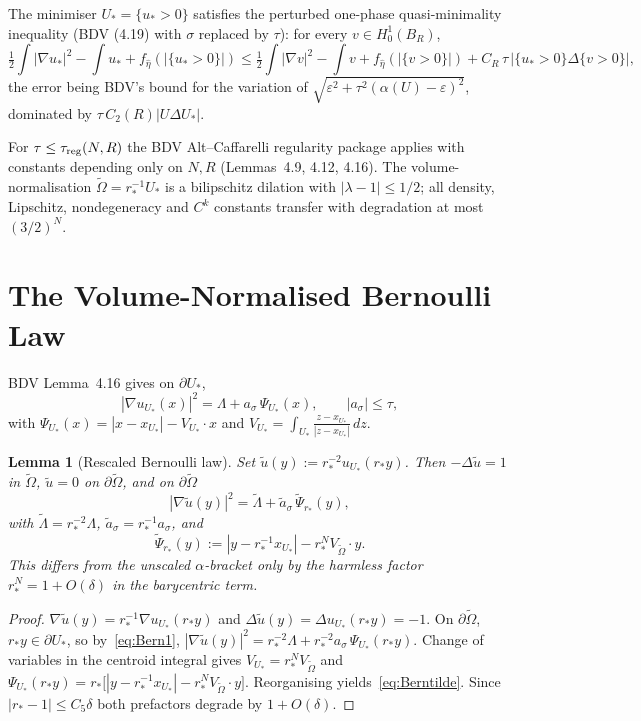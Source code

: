 \documentclass[11pt]{article}
\newtheorem{lemma}[theorem]{Lemma}
\theoremstyle{definition}
\newcommand{\eps}{\varepsilon}
\newcommand{\wt}{\widetilde}
\newcommand{\Om}{\Omega}
\begin{document}
The minimiser $U_*=\{u_*>0\}$ satisfies the perturbed one-phase
quasi-minimality inequality (BDV (4.19) with $\sigma$ replaced by $\tau$):
for every $v\in H^1_0(B_R)$,
\begin{equation}\label{eq:qmin}
\tfrac12\!\int|\nabla u_*|^2-\!\int u_*+f_{\hat\eta}(|\{u_*>0\}|)
\le\tfrac12\!\int|\nabla v|^2-\!\int v+f_{\hat\eta}(|\{v>0\}|)
+C_R\,\tau\,\bigl|\{u_*>0\}\Delta\{v>0\}\bigr|,
\end{equation}
the error being BDV's bound for the variation of
$\sqrt{\eps^2+\tau^2(\alpha(U)-\eps)^2}$, dominated by
$\tau\,C_2(R)|U\Delta U_*|$.

For $\tau\le\tau_{\rm reg}(N,R)$ the BDV Alt--Caffarelli regularity package
applies with constants depending only on $N,R$ (Lemmas~4.9, 4.12, 4.16).
The volume-normalisation $\wt\Om=r_*^{-1}U_*$ is a bilipschitz dilation with
$|\lambda-1|\le1/2$; all density, Lipschitz, nondegeneracy and $C^k$
constants transfer with degradation at most $(3/2)^N$.

\section{The Volume-Normalised Bernoulli Law}\label{sec:bern}

BDV Lemma~4.16 gives on $\partial U_*$,
\begin{equation}\label{eq:Bern1}
|\nabla u_{U_*}(x)|^2=\Lambda+a_\sigma\,\Psi_{U_*}(x),
\qquad |a_\sigma|\le\tau,
\end{equation}
with $\Psi_{U_*}(x)=|x-x_{U_*}|-V_{U_*}\cdot x$ and
$V_{U_*}=\int_{U_*}\frac{z-x_{U_*}}{|z-x_{U_*}|}\,dz$.

\begin{lemma}[Rescaled Bernoulli law]\label{lem:bern}
Set $\wt u(y):=r_*^{-2}u_{U_*}(r_*y)$. Then $-\Delta\wt u=1$ in $\wt\Om$,
$\wt u=0$ on $\partial\wt\Om$, and on $\partial\wt\Om$
\begin{equation}\label{eq:Berntilde}
|\nabla\wt u(y)|^2=\wt\Lambda+\wt a_\sigma\,\wt\Psi_{r_*}(y),
\end{equation}
with $\wt\Lambda=r_*^{-2}\Lambda$, $\wt a_\sigma=r_*^{-1}a_\sigma$, and
\[
   \wt\Psi_{r_*}(y):=
   |y-r_*^{-1}x_{U_*}|-r_*^{N}V_{\wt\Om}\cdot y.
\]
This differs from the unscaled $\alpha$-bracket only by the harmless
factor $r_*^N=1+O(\delta)$ in the barycentric term.
\end{lemma}

\begin{proof}
$\nabla\wt u(y)=r_*^{-1}\nabla u_{U_*}(r_*y)$ and $\Delta\wt
u(y)=\Delta u_{U_*}(r_*y)=-1$. On $\partial\wt\Om$, $r_*y\in\partial U_*$,
so by~\eqref{eq:Bern1},
$|\nabla\wt u(y)|^2=r_*^{-2}\Lambda+r_*^{-2}a_\sigma\,\Psi_{U_*}(r_*y)$.
Change of variables in the centroid integral gives
$V_{U_*}=r_*^N V_{\wt\Om}$ and
$\Psi_{U_*}(r_*y)=r_*\bigl[|y-r_*^{-1}x_{U_*}|-r_*^N V_{\wt\Om}\cdot y\bigr]$.
Reorganising yields~\eqref{eq:Berntilde}. Since $|r_*-1|\le C_5\delta$ both
prefactors degrade by $1+O(\delta)$.
\end{proof}
\end{document}
